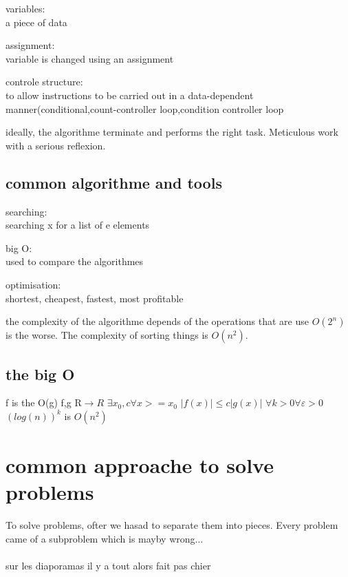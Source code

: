 \documentclass[a4paper,10pt]{article}
\begin{document}
\begin{description}
 \item variables:\\{a piece of data}
 \item assignment:\\{variable is changed using an assignment}
 \item controle structure:\\{to allow instructions to be carried out in a data-dependent manner(conditional,count-controller loop,condition controller loop}
\end{description}

ideally, the algorithme terminate and performs the right task. Meticulous work with a serious reflexion.

\subsection{common algorithme and tools}
\begin{description}
 \item searching:\\{searching x for a list of e elements}
 \item big O:\\{used to compare the algorithmes}
 \item optimisation:\\{shortest, cheapest, fastest, most profitable}
\end{description}
the complexity of the algorithme depends of the operations that are use $O(2^n)$ is the worse. The complexity of sorting things is $O(n^2)$.

\subsection{the big O}
 f is the O(g)   f,g R$\longrightarrow R$
 \newline
 $\exists x_0,c\forall x>=x_0$  $|f(x)| \leq c|g(x)|$
 \newline
 $\forall k>0\forall \varepsilon>0$ $(log(n))^k$ is $O(n^2)$
 
 \section{common approache to solve problems}
 To solve problems, ofter we hasad to separate them into pieces. Every problem came of a subproblem which is mayby wrong...
 
 \paragraph{}
 sur les diaporamas il y a tout alors fait pas chier
 
\end{document}

